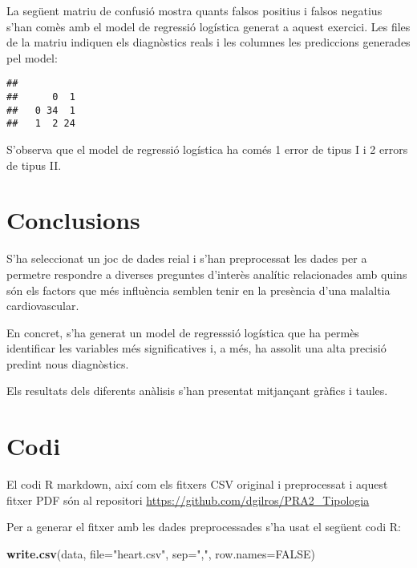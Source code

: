 \documentclass[12,]{article}
\newenvironment{Shaded}{\begin{snugshade}}{\end{snugshade}}
\newcommand{\DataTypeTok}[1]{\textcolor[rgb]{0.13,0.29,0.53}{#1}}
\newcommand{\KeywordTok}[1]{\textcolor[rgb]{0.13,0.29,0.53}{\textbf{#1}}}
\newcommand{\NormalTok}[1]{#1}
\newcommand{\OperatorTok}[1]{\textcolor[rgb]{0.81,0.36,0.00}{\textbf{#1}}}
\newcommand{\OtherTok}[1]{\textcolor[rgb]{0.56,0.35,0.01}{#1}}
\newcommand{\StringTok}[1]{\textcolor[rgb]{0.31,0.60,0.02}{#1}}
\begin{document}
La següent matriu de confusió mostra quants falsos positius i falsos
negatius s'han comès amb el model de regressió logística generat a
aquest exercici. Les files de la matriu indiquen els diagnòstics reals i
les columnes les prediccions generades pel model:

\begin{Shaded}
\end{Shaded}

\begin{verbatim}
##    
##      0  1
##   0 34  1
##   1  2 24
\end{verbatim}

S'observa que el model de regressió logística ha comés 1 error de tipus
I i 2 errors de tipus II.

\hypertarget{conclusions}{%
\section{Conclusions}\label{conclusions}}

S'ha seleccionat un joc de dades reial i s'han preprocessat les dades
per a permetre respondre a diverses preguntes d'interès analític
relacionades amb quins són els factors que més influència semblen tenir
en la presència d'una malaltia cardiovascular.

En concret, s'ha generat un model de regresssió logística que ha permès
identificar les variables més significatives i, a més, ha assolit una
alta precisió predint nous diagnòstics.

Els resultats dels diferents anàlisis s'han presentat mitjançant gràfics
i taules.

\hypertarget{codi}{%
\section{Codi}\label{codi}}

El codi R markdown, així com els fitxers CSV original i preprocessat i
aquest fitxer PDF són al repositori
\url{https://github.com/dgilros/PRA2_Tipologia}

Per a generar el fitxer amb les dades preprocessades s'ha usat el
següent codi R:

\begin{Shaded}
\begin{Highlighting}[]
\KeywordTok{write.csv}\NormalTok{(data, }\DataTypeTok{file=}\StringTok{"heart.csv"}\NormalTok{, }\DataTypeTok{sep=}\StringTok{","}\NormalTok{, }\DataTypeTok{row.names=}\OtherTok{FALSE}\NormalTok{)}
\end{Highlighting}
\end{Shaded}
\end{document}
